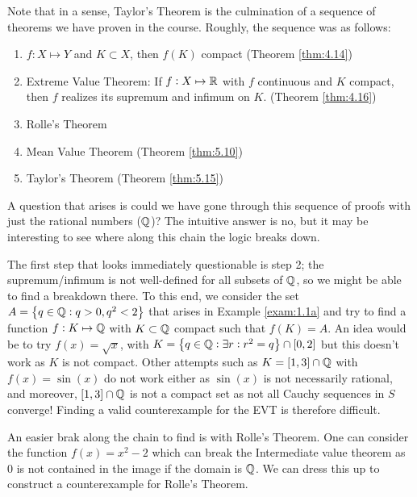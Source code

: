 Note that in a sense, Taylor's Theorem is the culmination of a sequence of theorems we have proven in the course. Roughly, the sequence was as follows:
\begin{enumerate}[1)]
    \item $f: X \mapsto Y$ and $K \subset X$, then $f(K)$ compact (Theorem \ref{thm:4.14})
    \item Extreme Value Theorem: If $f: X \mapsto \mathbb{R}$ with $f$ continuous and $K$ compact, then $f$ realizes its supremum and infimum on $K$. (Theorem \ref{thm:4.16})
    \item Rolle's Theorem
    \item Mean Value Theorem (Theorem \ref{thm:5.10})
    \item Taylor's Theorem (Theorem \ref{thm:5.15})
\end{enumerate}
A question that arises is could we have gone through this sequence of proofs with just the rational numbers ($\mathbb{Q}$)? The intuitive answer is no, but it may be interesting to see where along this chain the logic breaks down.

The first step that looks immediately questionable is step 2; the supremum/infimum is not well-defined for all subsets of $\mathbb{Q}$, so we might be able to find a breakdown there. To this end, we consider the set $A = \set{q \in \mathbb{Q}: q > 0, q^2 < 2}$ that arises in Example \ref{exam:1.1a} and try to find a function $f: K \mapsto \mathbb{Q}$ with $K \subset \mathbb{Q}$ compact such that $f(K) = A$. An idea would be to try $f(x) = \sqrt{x}$, with $K = \set{q \in \mathbb{Q}: \exists r: r^2 = q} \cap [0, 2]$ but this doesn't work as $K$ is not compact. Other attempts such as $K = [1, 3] \cap \mathbb{Q}$ with $f(x) = \sin(x)$ do not work either as $\sin(x)$ is not necessarily rational, and moreover, $[1, 3] \cap \mathbb{Q}$ is not a compact set as not all Cauchy sequences in $S$ converge! Finding a valid counterexample for the EVT is therefore difficult. 

An easier brak along the chain to find is with Rolle's Theorem. One can consider the function $f(x) = x^2 - 2$ which can break the Intermediate value theorem as $0$ is not contained in the image if the domain is $\mathbb{Q}$. We can dress this up to construct a counterexample for Rolle's Theorem.

